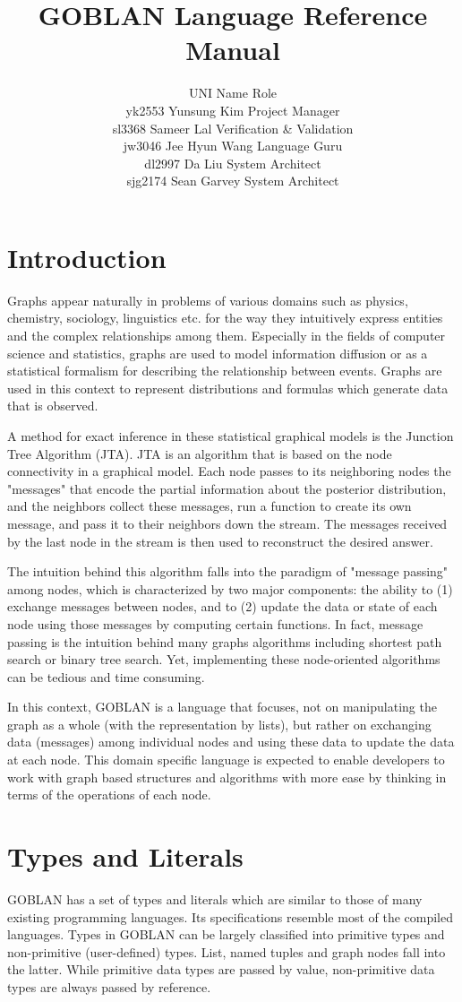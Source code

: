\documentclass{article}
\title{GOBLAN Language Reference Manual}
\author{
UNI 			Name			Role \\
yk2553 		Yunsung Kim		Project Manager  \\
sl3368 			Sameer Lal		Verification \& Validation \\
jw3046 		Jee Hyun Wang	Language Guru \\
dl2997 		Da Liu			System Architect \\
sjg2174		Sean Garvey		System Architect }
\date{}
\begin{document}
\maketitle
\tableofcontents

\section{Introduction}
Graphs appear naturally in problems of various domains such as physics, chemistry, sociology, linguistics etc. for the way they intuitively express entities and the complex relationships among them. Especially in the fields of computer science and statistics, graphs are used to model information diffusion or as a statistical formalism for describing the relationship between events. Graphs are used in this context to represent distributions and formulas which generate data that is observed.

A method for exact inference in these statistical graphical models is the Junction Tree Algorithm (JTA). JTA is an algorithm that is based on the node connectivity in a graphical model. Each node passes to its neighboring nodes the "messages" that encode the partial information about the posterior distribution, and the neighbors collect these messages, run a function to create its own message, and pass it to their neighbors down the stream. The messages received by the last node in the stream is then used to reconstruct the desired answer.

The intuition behind this algorithm falls into the paradigm of "message passing" among nodes, which is characterized by two major components: the ability to (1) exchange messages between nodes, and to (2) update the data or state of each node using those messages by computing certain functions. In fact, message passing is the intuition behind many graphs algorithms including shortest path search or binary tree search. Yet, implementing these node-oriented algorithms can be tedious and time consuming.

In this context, GOBLAN is a language that focuses, not on manipulating the graph as a whole (with the representation by lists), but rather on exchanging data (messages) among individual nodes and using these data to update the data at each node. This domain specific language is expected to enable developers to work with graph based structures and algorithms with more ease by thinking in terms of the operations of each node.

\section{Types and Literals}
GOBLAN has a set of types and literals which are similar to those of many existing programming languages. Its specifications resemble most of the compiled languages. Types in GOBLAN can be largely classified into primitive types and non-primitive (user-defined) types. List, named tuples and graph nodes fall into the latter. While primitive data types are passed by value, non-primitive data types are always passed by reference.
\end{document}
